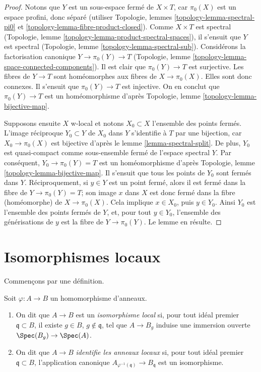 \begin{proof}
Notons que $Y$ est un sous-espace ferm\'e de $X \times T$, car $\pi_0(X)$
est un espace profini, donc s\'epar\'e
(utiliser Topologie, lemmes \ref{topology-lemma-spectral-pi0} et
\ref{topology-lemma-fibre-product-closed}).
Comme $X \times T$ est spectral
(Topologie, lemme \ref{topology-lemma-product-spectral-spaces}),
il s'ensuit que $Y$ est spectral
(Topologie, lemme \ref{topology-lemma-spectral-sub}).
Consid\'erons la factorisation canonique $Y \to \pi_0(Y) \to T$
(Topologie, lemme \ref{topology-lemma-space-connected-components}).
Il est clair que $\pi_0(Y) \to T$ est surjective.
Les fibres de $Y \to T$ sont hom\'eomorphes aux fibres de
$X \to \pi_0(X)$. Elles sont donc connexes. Il s'ensuit
que $\pi_0(Y) \to T$ est injective. On en conclut que $\pi_0(Y) \to T$
est un hom\'eomorphisme d'apr\`es
Topologie, lemme \ref{topology-lemma-bijective-map}.

\medskip\noindent
Supposons ensuite $X$ w-local et notons $X_0 \subset X$
l'ensemble des points ferm\'es. L'image r\'eciproque $Y_0 \subset Y$ de $X_0$ dans
$Y$ s'identifie à $T$ par une bijection, car $X_0 \to \pi_0(X)$ est bijective
d'apr\`es le lemme \ref{lemma-spectral-split}. De plus, $Y_0$ est quasi-compact
comme sous-ensemble ferm\'e de l'espace spectral $Y$. Par cons\'equent,
$Y_0 \to \pi_0(Y) = T$ est un hom\'eomorphisme d'apr\`es
Topologie, lemme \ref{topology-lemma-bijective-map}.
Il s'ensuit que tous les points de $Y_0$ sont ferm\'es dans $Y$.
R\'eciproquement, si $y \in Y$ est un point ferm\'e, alors
il est ferm\'e dans la fibre de $Y \to \pi_0(Y) = T$;
son image $x$ dans $X$ est donc ferm\'e dans la fibre (hom\'eomorphe) de
$X \to \pi_0(X)$. Cela implique $x \in X_0$, puis $y \in Y_0$.
Ainsi $Y_0$ est l'ensemble des points ferm\'es de $Y$,
et, pour tout $y \in Y_0$, l'ensemble des g\'en\'erisations de $y$ est
la fibre de $Y \to \pi_0(Y)$. Le lemme en r\'esulte.
\end{proof}




\section{Isomorphismes locaux}
\label{section-local-isomorphism}

\noindent
Commen\c{c}ons par une d\'efinition.

\begin{definition}
\label{definition-local-isomorphism}
Soit $\varphi : A \to B$ un homomorphisme d'anneaux.
\begin{enumerate}
\item On dit que $A \to B$ est un {\it isomorphisme local} si, pour tout id\'eal premier
$\mathfrak q \subset B$, il existe $g \in B$, $g \not \in \mathfrak q$,
tel que $A \to B_g$ induise une immersion ouverte $\Spec(B_g) \to \Spec(A)$.
\item On dit que $A \to B$ {\it identifie les anneaux locaux} si, pour tout id\'eal premier
$\mathfrak q \subset B$, l'application canonique
$A_{\varphi^{-1}(\mathfrak q)} \to B_\mathfrak q$ est un isomorphisme.
\end{enumerate}
\end{definition}

